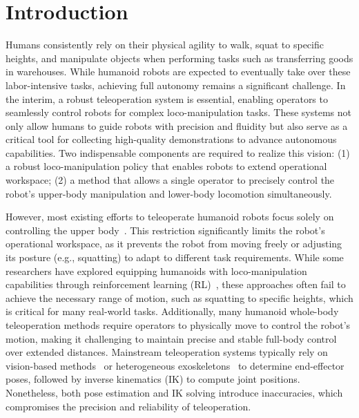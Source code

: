 \section{Introduction}
Humans consistently rely on their physical agility to walk, squat to specific heights, and manipulate objects when performing tasks such as transferring goods in warehouses. While humanoid robots are expected to eventually take over these labor-intensive tasks, achieving full autonomy remains a significant challenge. In the interim, a robust teleoperation system is essential, enabling operators to seamlessly control robots for complex loco-manipulation tasks. These systems not only allow humans to guide robots with precision and fluidity but also serve as a critical tool for collecting high-quality demonstrations to advance autonomous capabilities. Two indispensable components are required to realize this vision: (1) a robust loco-manipulation policy that enables robots to extend operational workspace; (2) a method that allows a single operator to precisely control the robot's upper-body manipulation and lower-body locomotion simultaneously.

However, most existing efforts to teleoperate humanoid robots focus solely on controlling the upper body~\cite{cheng2024open,yang2024ace,ze2024humanoid_manipulation,qin2023anyteleop,iyer2024open}. This restriction significantly limits the robot's operational workspace, as it prevents the robot from moving freely or adjusting its posture (e.g., squatting) to adapt to different task requirements. While some researchers have explored equipping humanoids with loco-manipulation capabilities through reinforcement learning (RL)~\cite{fu2024humanplus,he2024learning,he2024omnih2o,cheng2024express,ji2024exbody2,lu2024pmp}, these approaches often fail to achieve the necessary range of motion, such as squatting to specific heights, which is critical for many real-world tasks. Additionally, many humanoid whole-body teleoperation methods require operators to physically move to control the robot's motion, making it challenging to maintain precise and stable full-body control over extended distances. Mainstream teleoperation systems typically rely on vision-based methods~\cite{cheng2024open,ze2024humanoid_manipulation,qin2023anyteleop,iyer2024open} or heterogeneous exoskeletons~\cite{yang2024ace} to determine end-effector poses, followed by inverse kinematics (IK) to compute joint positions. Nonetheless, both pose estimation and IK solving introduce inaccuracies, which compromises the precision and reliability of teleoperation.

